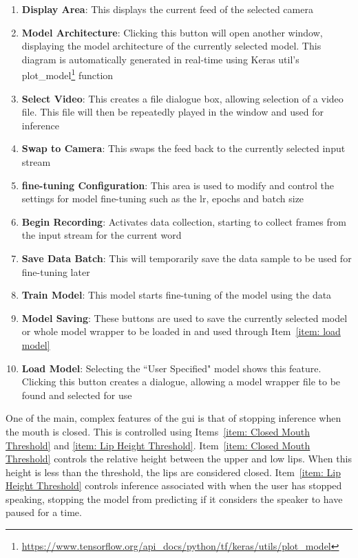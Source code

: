 \begin{enumerate}
    \item \textbf{Display Area}: This displays the current feed of the selected camera
    \item \textbf{Model Architecture}: Clicking this button will open another window, displaying the model architecture of the currently selected model. This diagram is automatically generated in real-time using Keras util's plot\_model\footnote{\url{https://www.tensorflow.org/api_docs/python/tf/keras/utils/plot_model}} function
    \item \textbf{Select Video}: This creates a file dialogue box, allowing selection of a video file. This file will then be repeatedly played in the window and used for inference
    \item \textbf{Swap to Camera}: This swaps the feed back to the currently selected input stream
    \item \textbf{\Gls{fine-tuning} Configuration}: This area is used to modify and control the settings for model \gls{fine-tuning} such as the \acrshort{lr}, epochs and batch size \label{item: fine-tune settings}
    \item \textbf{Begin Recording}: Activates data collection, starting to collect frames from the input stream for the current word \label{item: begin recording} 
    \item \textbf{Save Data Batch}: This will temporarily save the data sample to be used for \gls{fine-tuning} later \label{item: save data} 
    \item \textbf{Train Model}: This model starts \gls{fine-tuning} of the model using the data \label{item: finetune} 
    \item \textbf{Model Saving}: These buttons are used to save the currently selected model or whole model wrapper to be loaded in and used through Item~\ref{item: load model}
    \item \textbf{Load Model}: Selecting the ``User Specified" model shows this feature. Clicking this button creates a dialogue, allowing a model wrapper file to be found and selected for use \label{item: load model} 
\end{enumerate}
One of the main, complex features of the \acrshort{gui} is that of stopping inference when the mouth is closed. This is controlled using Items~\ref{item: Closed Mouth Threshold} and \ref{item: Lip Height Threshold}. Item~\ref{item: Closed Mouth Threshold} controls the relative height between the upper and low lips. When this height is less than the threshold, the lips are considered closed. Item~\ref{item: Lip Height Threshold} controls inference associated with when the user has stopped speaking, stopping the model from predicting if it considers the speaker to have paused for a time.\\
